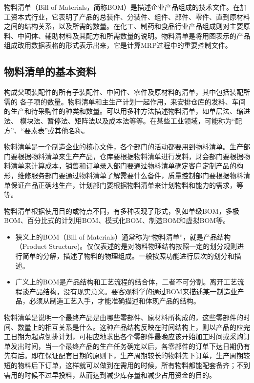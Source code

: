      物料清单（Bill of Materials，简称BOM）是描述企业产品组成的技术文件。在加工资本式行业，它表明了产品的总装件、分装件、组件、部件、零件、直到原材料之间的结构关系，以及所需的数量。在化工、制药和食品行业产品组成则对主要原料、中间体、辅助材料及其配方和所需数量的说明。物料清单是将用图表示的产品组成改用数据表格的形式表示出来，它是计算MRP过程中的重要控制文件。

\subsection {物料清单的基本资料}

    构成父项装配件的所有子装配件、中间件、零件及原材料的清单，其中包括装配所需的 各子项的数量。物料清单和主生产计划一起作用，来安排仓库的发料、车间的生产和待采购件的种类和数量。可以用多种方法描述物料清单，如单层法、缩进法、 模块法、暂停法、矩阵法以及成本法等等。在某些工业领域，可能称为“配方”、“要素表”或其他名称。

    物料清单是一个制造企业的核心文件，各个部门的活动都要用到物料清单。生产部门要根据物料清单来生产产品，仓库要根据物料清单进行发料，财会部门要根据物料清单来计算成本，销售和订单录入部门要通过物料清单确定客户定制产品的构形，维修服务部门要通过物料清单了解需要什么备件，质量控制部门要根据物料清单保证产品正确地生产，计划部门要根据物料清单来计划物料和能力的需求，等等。

    物料清单根据使用目的或特点不同，有多种表现了形式，例如单级BOM，多极BOM、百分比式的计划用BOM、模式化BOM、制造BOM和虚拟BOM等。

    \begin{itemize}
        \item  狭义上的BOM（Bill of Materials）通常称为“物料清单”，就是产品结构（Product Structure)。仅仅表述的是对物料物理结构按照一定的划分规则进行简单的分解，描述了物料的物理组成。一般按照功能进行层次的划分和描述。
        \item  广义上的BOM是产品结构和工艺流程的结合体，二者不可分割。离开工艺流程谈产品结构，没有现实意义。要客观科学的通过BOM来描述某一制造业产品，必须从制造工艺入手，才能准确描述和体现产品的结构。
    \end{itemize}

    物料清单是说明一个最终产品是由哪些零部件、原材料所构成的，这些零部件的时间、数量上的相互关系是什么。这种产品结构反映在时间结构上，则以产品的应完工日期为起点倒排计划，可相应地求出各个零部件最晚应该开始加工时间或采购订单发出时间，当一个最终产品的生产任务确定以后，各零部件的订单下达日期仍有先有后。即在保证配套日期的原则下，生产周期较长的物料先下订单，生产周期较短的物料后下订单，这样就可以做到在需用的时候，所有物料都能配套备齐；不到需用的时候不过早投料，从而达到减少库存量和减少占用资金的目的。

